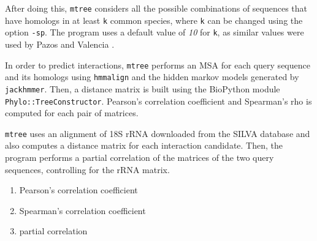 \documentclass[11pt]{article}
\begin{document}
After doing this, \texttt{mtree} considers all the possible combinations of sequences that have homologs in at least \texttt{k} common species, where \texttt{k} can be changed using the option \texttt{-sp}. The program uses a default value of \emph{10} for \texttt{k}, as similar values were used by Pazos and Valencia \cite{Pazos2001}.


In order to predict interactions, \texttt{mtree} performs an MSA for each query sequence and its homologs using \texttt{hmmalign} and the hidden markov models generated by \texttt{jackhmmer}. Then, a distance matrix is built using the BioPython module \texttt{Phylo::TreeConstructor}. Pearson's correlation coefficient and Spearman's rho is computed for each pair of matrices. 

\texttt{mtree} uses an alignment of 18S rRNA downloaded from the SILVA database \cite{SILVA} and also computes a distance matrix for each interaction candidate. Then, the program performs a partial correlation of the matrices of the two query sequences, controlling for the rRNA matrix. 




\begin{enumerate}
\item Pearson's correlation coefficient
\item Spearman's correlation coefficient
\item partial correlation 
\end{enumerate}
\end{document}
